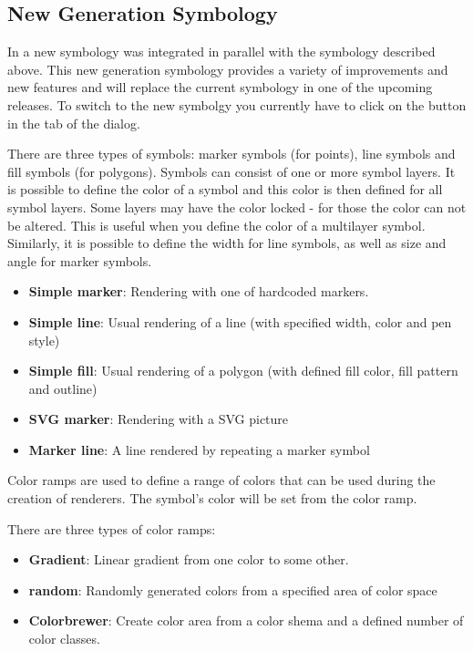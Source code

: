 \subsection{New Generation Symbology}

In \qg \CURRENT a new symbology was integrated in parallel with the symbology 
described above. This new generation symbology provides a variety of improvements and 
new features and will replace the current symbology in one of the upcoming releases. 
To switch to the new symbolgy you currently have to click on the  button in the  tab of the  dialog.  


There are three types of symbols: marker symbols (for points), line symbols and 
fill symbols (for polygons). Symbols can consist of one or more symbol layers. It 
is possible to define the color of a symbol and this color is then defined for all 
symbol layers. Some layers may have the color locked - for those the color can not 
be altered. This is useful when you define the color of a multilayer symbol. 
Similarly, it is possible to define the width for line symbols, as well as size and 
angle for marker symbols.


\begin{itemize}[label=--]
\item \textbf{Simple marker}: Rendering with one of hardcoded markers.
\item \textbf{Simple line}: Usual rendering of a line (with specified 
width, color and pen style) 
\item \textbf{Simple fill}: Usual rendering of a polygon (with defined 
fill color, fill pattern and outline) 
\item \textbf{SVG marker}: Rendering with a SVG picture 
\item \textbf{Marker line}: A line rendered by repeating a marker symbol 
\end{itemize}


Color ramps are used to define a range of colors that can be used during 
the creation of renderers. The symbol's color will be set from the color ramp. 

There are three types of color ramps:

\begin{itemize}[label=--]
\item \textbf{Gradient}: Linear gradient from one color to some other.
\item \textbf{random}: Randomly generated colors from a specified area of 
color space 
\item \textbf{Colorbrewer}: Create color area from a color shema and a defined 
number of color classes.
\end{itemize}

